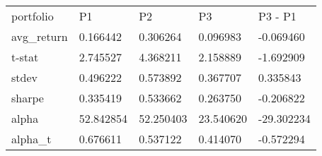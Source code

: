 \begin{tabular}{lllll}
\toprule
\midrule
portfolio & P1 & P2 & P3 & P3 - P1 \\
avg_return & 0.166442 & 0.306264 & 0.096983 & -0.069460 \\
t-stat & 2.745527 & 4.368211 & 2.158889 & -1.692909 \\
stdev & 0.496222 & 0.573892 & 0.367707 & 0.335843 \\
sharpe & 0.335419 & 0.533662 & 0.263750 & -0.206822 \\
alpha & 52.842854 & 52.250403 & 23.540620 & -29.302234 \\
alpha_t & 0.676611 & 0.537122 & 0.414070 & -0.572294 \\
\bottomrule
\end{tabular}
